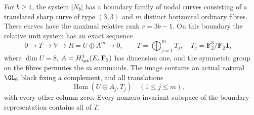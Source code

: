 \begin{lemma}
\label{lem:mixed-strip-boundary-candidate}
For $b\ge4$, the system $|N_b|$ has a boundary family of nodal
curves consisting of a translated sharp curve of type $(3,3)$
and $m$ distinct horizontal ordinary fibres. These curves have
the maximal relative rank $r=3b-1$.
On this boundary the relative unit system has an exact sequence
\[
 0\longrightarrow T\longrightarrow V\longrightarrow
 R=U\oplus A^m\longrightarrow0,
 \qquad T=\bigoplus_{j=1}^m T_j,
 \quad T_j=\mathbf F_2^3/\mathbf F_2\mathbf1,
\]
where $\dim U=8$, $A=H^1_{\et}(E,\mathbf F_2)$ has dimension
one, and the symmetric group on the fibres permutes the $m$
summands. The image contains an actual natural $\GL_8$ block
fixing a complement, and all translations
\[
            \operatorname{Hom}(U\oplus A_j,T_j)
                    \quad(1\le j\le m),                 \tag{Strip-1}
\]
with every other column zero. Every nonzero invariant subspace
of the boundary representation contains all of $T$.
\end{lemma}
